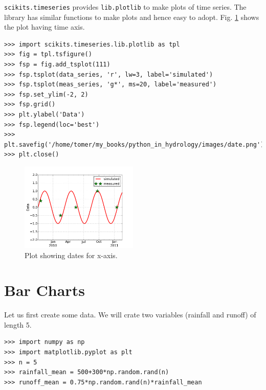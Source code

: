 \documentclass[10pt]{book}
\begin{document}
\verb"scikits.timeseries" provides \verb"lib.plotlib" to make plots of time series. The library has similar functions to make plots  and hence easy to adopt. Fig. \ref{fig:date} shows the plot having time axis. 

\beforeverb \begin{verbatim}
>>> import scikits.timeseries.lib.plotlib as tpl
>>> fig = tpl.tsfigure()
>>> fsp = fig.add_tsplot(111)
>>> fsp.tsplot(data_series, 'r', lw=3, label='simulated')
>>> fsp.tsplot(meas_series, 'g*', ms=20, label='measured')
>>> fsp.set_ylim(-2, 2)
>>> fsp.grid()
>>> plt.ylabel('Data')
>>> fsp.legend(loc='best')
>>> plt.savefig('/home/tomer/my_books/python_in_hydrology/images/date.png')
>>> plt.close()
\end{verbatim} \afterverb

\beforefig
\begin{figure}[h!]
  \centering
    \includegraphics[width=0.5\textwidth]{images/date.png}
  \caption{Plot showing dates for x-axis.}
   \label{fig:date}
\end{figure}
\afterfig

\section{Bar Charts}
Let us first create some data. We will crate two variables (rainfall and runoff) of length 5. 
\beforeverb \begin{verbatim}
>>> import numpy as np
>>> import matplotlib.pyplot as plt
>>> n = 5
>>> rainfall_mean = 500+300*np.random.rand(n)
>>> runoff_mean = 0.75*np.random.rand(n)*rainfall_mean
\end{verbatim} \afterverb
\end{document}
